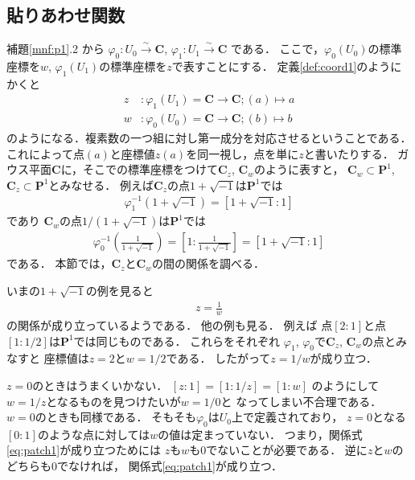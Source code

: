 \documentclass[11pt, a4paper, dvipdfmx, draft]{jsarticle}
\theoremstyle{definition}
\newcommand{\cc}{\mathbf{C}}
\newcommand{\pp}{\mathbf{P}}
\newcommand{\pphi}{\varphi} %
\newcommand{\isom}{\overset{\sim}{\longrightarrow}}
\theoremstyle{mystyle}
\numberwithin{equation}{section} %
\begin{document}
\subsection{貼りあわせ関数}\label{ssec:patch}

補題\ref{mnf:p1}.2 から
$\pphi_0 \colon U_0\isom\cc$, $\pphi_1\colon {U_1} \isom\cc$
である．
ここで，$\pphi_0(U_0)$の標準座標を$w$, 
$\pphi_1(U_1)$の標準座標を$z$で表すことにする．
定義\ref{def:coord1}のようにかくと
\begin{align*}
    z&\colon \pphi_1(U_1)= \cc \to \cc; (a)\mapsto a\\
    w&\colon \pphi_0(U_0)= \cc \to \cc; (b)\mapsto b
\end{align*}
のようになる．複素数の一つ組に対し第一成分を対応させるということである．
これによって点$(a)$と座標値$z(a)$を同一視し，点を単に$z$と書いたりする．
ガウス平面$\cc$に，そこでの標準座標をつけて$\cc_z$, $\cc_w$のように表すと，
$\cc_w\subset\pp^1$, $\cc_z\subset\pp^1$とみなせる．
例えば$\cc_z$の点$1+\sqrt{-1}$は$\pp^1$では
\begin{align*}
    \pphi_1^{-1}\left(1+\sqrt{-1}\right)=\left[1+\sqrt{-1}\colon 1\right]    
\end{align*}
であり
$\cc_w$の点$1/(1+\sqrt{-1})$は$\pp^1$では
\begin{align*}
    \pphi_0^{-1}\left(\frac{1}{1+\sqrt{-1}}\right)
    =\left[1\colon \frac{1}{1+\sqrt{-1}}\right]
    =\left[1+\sqrt{-1}\colon 1\right]        
\end{align*}
である．
本節では，$\cc_z$と$\cc_w$の間の関係を調べる．

いまの$1+\sqrt{-1}$の例を見ると
\begin{align}\label{eq:patch1}
    z=\frac{1}{w}
\end{align}
の関係が成り立っているようである．
他の例も見る．
例えば
点$[2\colon 1]$と点$[1\colon 1/2]$は$\pp^1$では同じものである．
これらをそれぞれ
$\pphi_1$, $\pphi_0$で$\cc_z$, $\cc_w$の点とみなすと
座標値は$z=2$と$w=1/2$である．
したがって$z=1/w$が成り立つ．

$z=0$のときはうまくいかない．
$[z\colon 1] = [1\colon 1/z] = [1\colon w]$
のようにして$w=1/z$となるものを見つけたいが$w=1/0$と
なってしまい不合理である．
$w=0$のときも同様である．
そもそも$\pphi_0$は$U_0$上で定義されており，
$z=0$となる$[0\colon 1]$のような点に対しては$w$の値は定まっていない．
つまり，関係式\eqref{eq:patch1}が成り立つためには
$z$も$w$も0でないことが必要である．
逆に$z$と$w$のどちらも0でなければ，
関係式\eqref{eq:patch1}が成り立つ．
\end{document}

